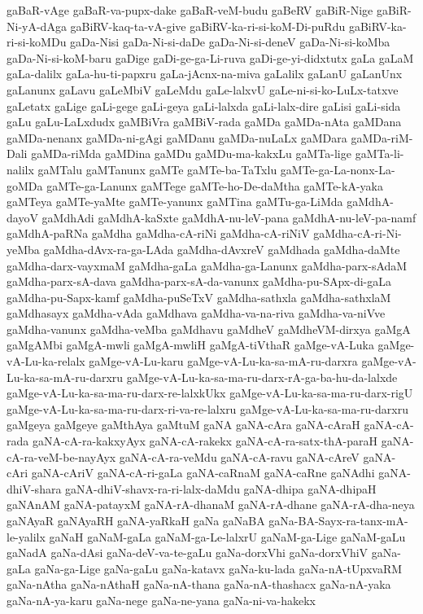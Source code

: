 {gaBaR-vAge
gaBaR-va-pupx-dake
gaBaR-veM-budu
gaBeRV
gaBiR-Nige
gaBiR-Ni-yA-dAga
gaBiRV-kaq-ta-vA-give
gaBiRV-ka-ri-si-koM-Di-puRdu
gaBiRV-ka-ri-si-koMDu
gaDa-Nisi
gaDa-Ni-si-daDe
gaDa-Ni-si-deneV
gaDa-Ni-si-koMba
gaDa-Ni-si-koM-baru
gaDige
gaDi-ge-ga-Li-ruva
gaDi-ge-yi-didxtutx
gaLa
gaLaM
gaLa-dalilx
gaLa-hu-ti-papxru
gaLa-jAcnx-na-miva
gaLalilx
gaLanU
gaLanUnx
gaLanunx
gaLavu
gaLeMbiV
gaLeMdu
gaLe-lalxvU
gaLe-ni-si-ko-LuLx-tatxve
gaLetatx
gaLige
gaLi-gege
gaLi-geya
gaLi-lalxda
gaLi-lalx-dire
gaLisi
gaLi-sida
gaLu
gaLu-LaLxdudx
gaMBiVra
gaMBiV-rada
gaMDa
gaMDa-nAta
gaMDana
gaMDa-nenanx
gaMDa-ni-gAgi
gaMDanu
gaMDa-nuLaLx
gaMDara
gaMDa-riM-Dali
gaMDa-riMda
gaMDina
gaMDu
gaMDu-ma-kakxLu
gaMTa-lige
gaMTa-li-nalilx
gaMTalu
gaMTanunx
gaMTe
gaMTe-ba-TaTxlu
gaMTe-ga-La-nonx-La-goMDa
gaMTe-ga-Lanunx
gaMTege
gaMTe-ho-De-daMtha
gaMTe-kA-yaka
gaMTeya
gaMTe-yaMte
gaMTe-yanunx
gaMTina
gaMTu-ga-LiMda
gaMdhA-dayoV
gaMdhAdi
gaMdhA-kaSxte
gaMdhA-nu-leV-pana
gaMdhA-nu-leV-pa-namf
gaMdhA-paRNa
gaMdha
gaMdha-cA-riNi
gaMdha-cA-riNiV
gaMdha-cA-ri-Ni-yeMba
gaMdha-dAvx-ra-ga-LAda
gaMdha-dAvxreV
gaMdhada
gaMdha-daMte
gaMdha-darx-vayxmaM
gaMdha-gaLa
gaMdha-ga-Lanunx
gaMdha-parx-sAdaM
gaMdha-parx-sA-dava
gaMdha-parx-sA-da-vanunx
gaMdha-pu-SApx-di-gaLa
gaMdha-pu-Sapx-kamf
gaMdha-puSeTxV
gaMdha-sathxla
gaMdha-sathxlaM
gaMdhasayx
gaMdha-vAda
gaMdhava
gaMdha-va-na-riva
gaMdha-va-niVve
gaMdha-vanunx
gaMdha-veMba
gaMdhavu
gaMdheV
gaMdheVM-dirxya
gaMgA
gaMgAMbi
gaMgA-mwli
gaMgA-mwliH
gaMgA-tiVthaR
gaMge-vA-Luka
gaMge-vA-Lu-ka-relalx
gaMge-vA-Lu-karu
gaMge-vA-Lu-ka-sa-mA-ru-darxra
gaMge-vA-Lu-ka-sa-mA-ru-darxru
gaMge-vA-Lu-ka-sa-ma-ru-darx-rA-ga-ba-hu-da-lalxde
gaMge-vA-Lu-ka-sa-ma-ru-darx-re-lalxkUkx
gaMge-vA-Lu-ka-sa-ma-ru-darx-rigU
gaMge-vA-Lu-ka-sa-ma-ru-darx-ri-va-re-lalxru
gaMge-vA-Lu-ka-sa-ma-ru-darxru
gaMgeya
gaMgeye
gaMthAya
gaMtuM
gaNA
gaNA-cAra
gaNA-cAraH
gaNA-cA-rada
gaNA-cA-ra-kakxyAyx
gaNA-cA-rakekx
gaNA-cA-ra-satx-thA-paraH
gaNA-cA-ra-veM-be-nayAyx
gaNA-cA-ra-veMdu
gaNA-cA-ravu
gaNA-cAreV
gaNA-cAri
gaNA-cAriV
gaNA-cA-ri-gaLa
gaNA-caRnaM
gaNA-caRne
gaNAdhi
gaNA-dhiV-shara
gaNA-dhiV-shavx-ra-ri-lalx-daMdu
gaNA-dhipa
gaNA-dhipaH
gaNAnAM
gaNA-patayxM
gaNA-rA-dhanaM
gaNA-rA-dhane
gaNA-rA-dha-neya
gaNAyaR
gaNAyaRH
gaNA-yaRkaH
gaNa
gaNaBA
gaNa-BA-Sayx-ra-tanx-mA-le-yalilx
gaNaH
gaNaM-gaLa
gaNaM-ga-Le-lalxrU
gaNaM-ga-Lige
gaNaM-gaLu
gaNadA
gaNa-dAsi
gaNa-deV-va-te-gaLu
gaNa-dorxVhi
gaNa-dorxVhiV
gaNa-gaLa
gaNa-ga-Lige
gaNa-gaLu
gaNa-katavx
gaNa-ku-lada
gaNa-nA-tUpxvaRM
gaNa-nAtha
gaNa-nAthaH
gaNa-nA-thana
gaNa-nA-thashacx
gaNa-nA-yaka
gaNa-nA-ya-karu
gaNa-nege
gaNa-ne-yana
gaNa-ni-va-hakekx
}
